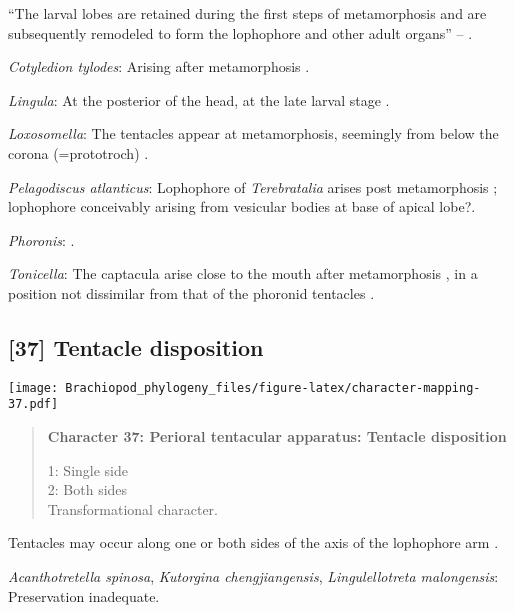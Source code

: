 \documentclass[openany]{book}
\theoremstyle{definition}
\theoremstyle{definition}
\theoremstyle{definition}
\theoremstyle{remark}
\begin{document}
``The larval lobes are retained during the first steps of metamorphosis
and are\\
subsequently remodeled to form the lophophore and other adult organs''
-- \citet{Altenburger2013}.

\hypertarget{Cotyledion_tylodes-coding-36}{}
\emph{Cotyledion tylodes}: Arising after metamorphosis
\citep{Nielsen1971}.

\hypertarget{Lingula-coding-36}{}
\emph{Lingula}: At the posterior of the head, at the late larval stage
\citep{Santagata2004}.

\hypertarget{Loxosomella-coding-36}{}
\emph{Loxosomella}: The tentacles appear at metamorphosis, seemingly
from below the corona (=prototroch) \citep{Young2002}.

\hypertarget{Pelagodiscus_atlanticus-coding-36}{}
\emph{Pelagodiscus atlanticus}: Lophophore of \emph{Terebratalia} arises
post metamorphosis \citep{Young2002}; lophophore conceivably arising
from vesicular bodies at base of apical lobe?.

\hypertarget{Phoronis-coding-36}{}
\emph{Phoronis}: \citep{Adrianov2006}.

\hypertarget{Tonicella-coding-36}{}
\emph{Tonicella}: The captacula arise close to the mouth after
metamorphosis \citep{Wanninger2002M}, in a position not dissimilar from
that of the phoronid tentacles \citep{Santagata2004}.

\subsection*{{[}37{]} Tentacle disposition}\label{tentacle-disposition}

\texttt{[image: Brachiopod\_phylogeny\_files/figure-latex/character-mapping-37.pdf]}

\begin{quote}
\textbf{Character 37: Perioral tentacular apparatus: Tentacle
disposition}

1: Single side\\
2: Both sides\\
Transformational character.
\end{quote}

Tentacles may occur along one or both sides of the axis of the
lophophore arm \citep{Carlson1995Phylogeneticrelationships}.

\hypertarget{Acanthotretella_spinosa-coding-37}{}
\emph{Acanthotretella spinosa}, \emph{Kutorgina chengjiangensis},
\emph{Lingulellotreta malongensis}: Preservation inadequate.
\end{document}
